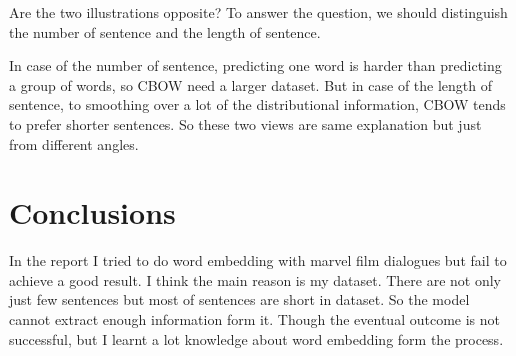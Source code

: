 \documentclass[a4paper,10pt]{article}
\begin{document}
Are the two illustrations opposite? To answer the question, we should distinguish the number of sentence and the length of sentence. 

In case of the number of sentence, predicting one word is harder than predicting a group of words, so CBOW need a larger dataset. But in case of the length of sentence, to smoothing over a lot of the distributional information, CBOW tends to prefer shorter sentences. So these two views are same explanation but just from different angles.

\section{Conclusions}
In the report I tried to do word embedding with marvel film dialogues but fail to achieve a good result. I think the main reason is my dataset. There are not only just few sentences but most of sentences are short in dataset. So the model cannot extract enough information form it. Though the eventual outcome is not successful, but I learnt a lot knowledge about word embedding form the process.

\newpage

\renewcommand\refname{Reference}


\end{document}
